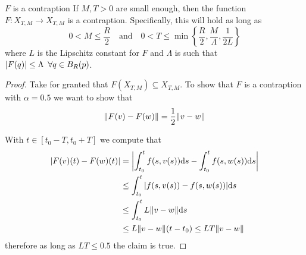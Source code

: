\documentclass[12pt]{extarticle}
\numberwithin{equation}{section}
\begin{document}
\begin{proposition}{$F$ is a contraption}{}
    If $M, T > 0$ are small enough, then the function $F: X_{T, M} \to X_{T, M}$
    is a contraption.
    Specifically, this will hold as long as
    \begin{equation}
        0 < M \leq \frac{R}{2} \quad \text{and} \quad 0 < T \leq \min \left\{ \frac{R}{2}, \frac{M}{\Lambda}, \frac{1}{2L} \right\}
    \end{equation}
    where $L$ is the Lipschitz constant for $F$ and
    $\Lambda$ is such that $\abs{F(q)} \leq \Lambda \enspace \forall q \in B_R(p)$.
\end{proposition}

\begin{proof}
    Take for granted that $F(X_{T, M}) \subseteq X_{T, M}$.
    To show that $F$ is a contraption with $\alpha = 0.5$ we want to show that
    \begin{equation}
        \norm{F(v) - F(w)} = \frac{1}{2} \norm{v-w}
    \end{equation}

    With $t \in [t_0 - T, t_0 + T]$ we compute that
    \begin{align}
        \abs{F(v)(t) - F(w)(t)} & = \abs{\int_{t_0}^{t} f(s,v(s)) \dd s - \int_{t_0}^{t} f(s,w(s)) \dd s} \\
                                & \leq \int_{t_0}^{t} \abs{f(s,v(s)) - f(s,w(s))} \dd s                   \\
                                & \leq \int_{t_0}^{t} L\norm{v - w} \dd s                                 \\
                                & \leq L \norm{v - w} (t - t_0) \leq LT \norm{v - w}                      \\
    \end{align}
    therefore as long as $LT \leq 0.5$ the claim is true.
\end{proof}
\end{document}
